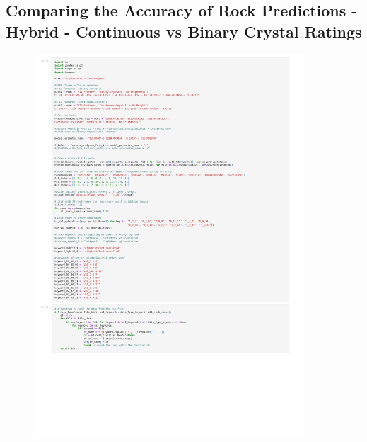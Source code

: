 
\subsection{Comparing the Accuracy of Rock Predictions - Hybrid - Continuous vs Binary Crystal Ratings}
\begin{figure}[H]
  \centering
    \includegraphics[width=0.9\textwidth, height=0.9\textheight]{Code/Compare2HybridModels V7.pdf}
\end{figure}

%
